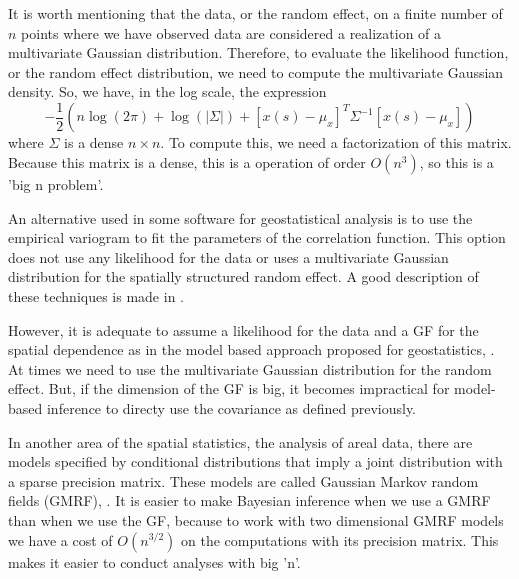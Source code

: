 It is worth mentioning that the data, or the random effect,  
on a finite number of $n$ points where we have observed 
data are considered a realization of a 
multivariate Gaussian distribution. 
Therefore, to evaluate the likelihood function, or the random 
effect distribution, we need to compute the 
multivariate Gaussian density. 
So, we have, in the log scale, the expression 
\begin{equation}
-\frac{1}{2}\left(n\log(2\pi) + \log(|\Sigma|) 
+ [x(s) - \mu_x]^{T}\Sigma^{-1}[x(s)-\mu_x]\right)
\end{equation}
where $\Sigma$ is a dense $n\times n$. 
To compute this, we need a factorization of this matrix. 
Because this matrix is a dense, this is a operation of 
order $O(n^3)$, so this is a 'big n problem'. 

An alternative used in some software for 
geostatistical analysis is to use the empirical 
variogram to fit the parameters of the correlation 
function. This option does not use any likelihood for 
the data or uses a multivariate Gaussian 
distribution for the spatially structured random effect. 
A good description of these techniques is made 
in \cite{cressie:1993}. 

However, it is adequate to assume a likelihood for the 
data and a GF for the spatial dependence as in the model 
based approach proposed for geostatistics, \cite{diggleribeiro:2007}. 
At times we need to use the multivariate 
Gaussian distribution for the random effect. 
But, if the dimension of the GF is big, 
it becomes impractical for model-based inference 
to directy use the covariance as defined previously. 

In another area of the spatial statistics, the 
analysis of areal data, there are models specified 
by conditional distributions that imply a joint 
distribution with a sparse precision matrix. 
These models are called Gaussian Markov random 
fields (GMRF), \cite{RueHeld:2005}. 
It is easier to make Bayesian inference when we use a GMRF 
than when we use the GF, because to work with two dimensional 
GMRF models we have a cost of $O(n^{3/2})$ 
on the computations with its precision matrix. 
This makes it easier to conduct analyses with big 'n'. 
